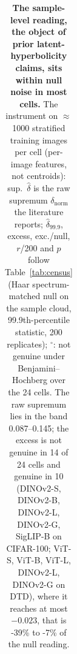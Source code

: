 \begin{table}[tbp]
\begin{tabular}{lccccc|ccccc}
\bottomrule
\end{tabular}
\par\vspace{5pt}
\caption{\textbf{The sample-level reading, the object of prior latent-hyperbolicity claims, sits within null noise in most cells.} The instrument on $\approx$1000 stratified training images per cell (per-image features, not centroids): sup.\ $\hat\delta$ is the raw supremum $\delta_{\text{norm}}$ the literature reports; $\hat\delta_{99.9}$, excess, exc./null, $r$/200 and $p$ follow Table~\ref{tab:census} (Haar spectrum-matched null on the sample cloud, 99.9th-percentile statistic, 200 replicates); $^{\circ}$: not genuine under Benjamini--Hochberg over the 24 cells. The raw supremum lies in the band 0.087--0.145; the excess is not genuine in 14 of 24 cells and genuine in 10 (DINOv2-S, DINOv2-B, DINOv2-L, DINOv2-G, SigLIP-B on CIFAR-100; ViT-S, ViT-B, ViT-L, DINOv2-L, DINOv2-G on DTD), where it reaches at most $-0.023$, that is -39\% to -7\% of the null reading. %
}
\label{tab:q3-sample}
\end{table}
